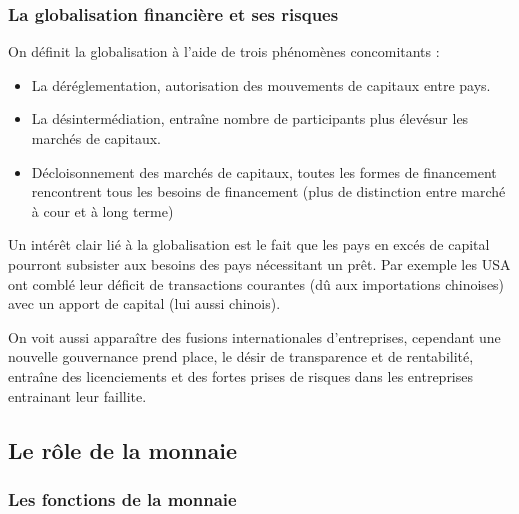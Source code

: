 
\subsubsection{La globalisation financière et ses risques} %
\label{sub:la_globalisation_financiere_et_ses_risques}

On définit la globalisation à l'aide de trois phénomènes concomitants : 
\begin{itemize}[label=]
	\item La déréglementation, autorisation des mouvements de capitaux entre pays.
	\item La désintermédiation, entraîne nombre de participants plus élevésur les marchés de capitaux.
	\item Décloisonnement des marchés de capitaux, toutes les formes de financement rencontrent tous les besoins de financement (plus de distinction entre
	marché à cour et à long terme) 
\end{itemize}

Un intérêt clair lié à la globalisation est le fait que les pays en excés de capital pourront subsister aux besoins des pays nécessitant un prêt. Par 
exemple les USA ont comblé leur déficit de transactions courantes (dû aux importations chinoises) avec un apport de capital (lui aussi chinois).

On voit aussi apparaître des fusions internationales d'entreprises, cependant une nouvelle gouvernance prend place, le désir de transparence et de rentabilité,
entraîne des licenciements et des fortes prises de risques dans les entreprises entrainant leur faillite.




\subsection{Le rôle de la monnaie} %
\label{sec:le_role_de_la_monnaie}

\subsubsection{Les fonctions de la monnaie} %
\label{sub:les_fonctions_de_la_monnaie}

